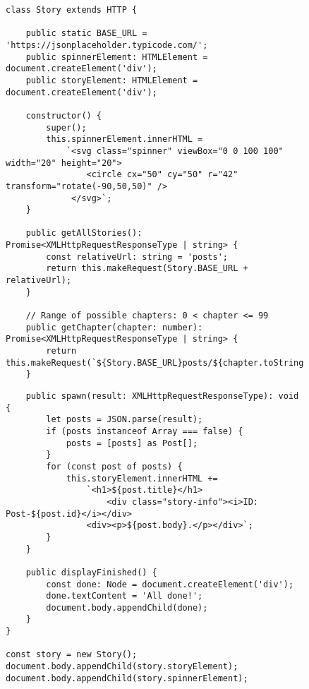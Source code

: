 \begin{figure}[H]
\begin{lstlisting}
class Story extends HTTP {

    public static BASE_URL = 'https://jsonplaceholder.typicode.com/';
    public spinnerElement: HTMLElement = document.createElement('div');
    public storyElement: HTMLElement = document.createElement('div');

    constructor() {
        super();
        this.spinnerElement.innerHTML =
            `<svg class="spinner" viewBox="0 0 100 100" width="20" height="20">
                <circle cx="50" cy="50" r="42" transform="rotate(-90,50,50)" />
             </svg>`;
    }

    public getAllStories(): Promise<XMLHttpRequestResponseType | string> {
        const relativeUrl: string = 'posts';
        return this.makeRequest(Story.BASE_URL + relativeUrl);
    }

    // Range of possible chapters: 0 < chapter <= 99
    public getChapter(chapter: number): Promise<XMLHttpRequestResponseType | string> {
        return this.makeRequest(`${Story.BASE_URL}posts/${chapter.toString()}`);
    }

\end{lstlisting}
\end{figure}
\begin{figure}[H]
\begin{lstlisting}
    public spawn(result: XMLHttpRequestResponseType): void {
        let posts = JSON.parse(result);
        if (posts instanceof Array === false) {
            posts = [posts] as Post[];
        }
        for (const post of posts) {
            this.storyElement.innerHTML +=
                `<h1>${post.title}</h1>
                    <div class="story-info"><i>ID: Post-${post.id}</i></div>
                <div><p>${post.body}.</p></div>`;
        }
    }

    public displayFinished() {
        const done: Node = document.createElement('div');
        done.textContent = 'All done!';
        document.body.appendChild(done);
    }
}

const story = new Story();
document.body.appendChild(story.storyElement);
document.body.appendChild(story.spinnerElement);
\end{lstlisting}
\end{figure}

